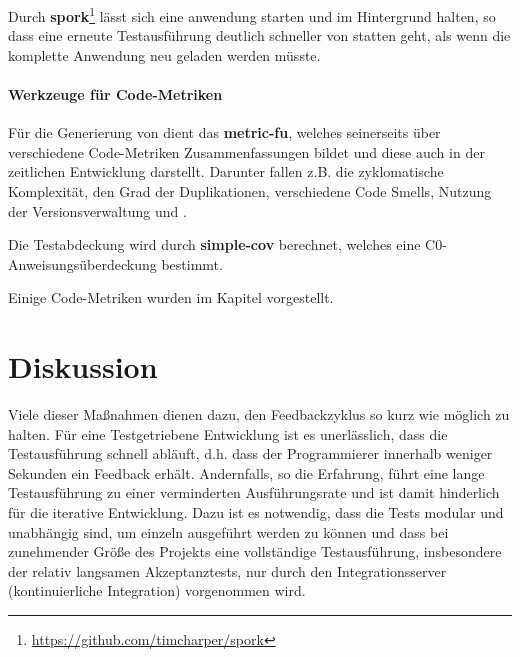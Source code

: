 Durch \textbf{spork}\footnote{\url{https://github.com/timcharper/spork}} lässt sich eine anwendung starten und im Hintergrund halten, so dass eine erneute Testausführung deutlich schneller von statten geht, als wenn die komplette Anwendung neu geladen werden müsste.


\paragraph{Werkzeuge für Code-Metriken} Für die Generierung von  dient das  \textbf{metric-fu}, welches seinerseits über verschiedene Code-Metriken Zusammenfassungen bildet und diese auch in der zeitlichen Entwicklung darstellt. Darunter fallen z.B. die zyklomatische Komplexität, den Grad der Duplikationen, verschiedene Code Smells, Nutzung der Versionsverwaltung und .

Die Testabdeckung wird durch \textbf{simple-cov} berechnet, welches eine C0\hyp{}Anweisungsüberdeckung bestimmt.

Einige Code-Metriken wurden im Kapitel  vorgestellt.


\section{Diskussion}

Viele dieser Maßnahmen dienen dazu, den Feedbackzyklus so kurz wie möglich zu halten. Für eine Testgetriebene Entwicklung ist es unerlässlich, dass die Testausführung schnell abläuft, d.h. dass der Programmierer innerhalb weniger Sekunden ein Feedback erhält. Andernfalls, so die Erfahrung, führt eine lange Testausführung zu einer verminderten Ausführungsrate und ist damit hinderlich für die iterative Entwicklung. Dazu ist es notwendig, dass die Tests modular und unabhängig sind, um einzeln ausgeführt werden zu können und dass bei zunehmender Größe des Projekts eine vollständige Testausführung, insbesondere der relativ langsamen Akzeptanztests, nur durch den Integrationsserver (kontinuierliche Integration) vorgenommen wird.


